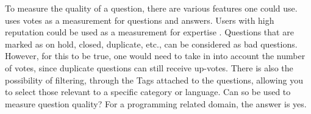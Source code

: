 To measure the quality of a question, there are various features one could use. 
\textcite{M.Sewak2010} uses votes as a measurement for questions and answers.
Users with high reputation could be used as a measurement for expertise \cite{Movshovitz-Attias2013}.
Questions that are marked as on hold, closed, duplicate, etc., can be considered as bad questions.
However, for this to be true, one would need to take in into account the number of votes, since duplicate questions can still receive up-votes.
There is also the possibility of filtering, through the Tags attached to the questions, allowing you to select those relevant to a specific category or language.
Can \gls{so} be used to measure question quality?
For a programming related domain, the answer is yes.

\begin{comment}
The same can be said for bad questions. 
In many cases, a question is bad not because of the question that is asked, but simply because it does not follow the guidelines. 
If a question is a duplicate, it is automatically voted for closure, and will in most cases receive multiple down-votes. 
Questions which gives a hint of being school related will also receive down-votes, mainly because \gls{so} targets professionals and experts. 
\gls{so} is neither a fan of unnecessary text like greetings and gratefulness \cite{CommunityWiki2016a,Heyer2012}.
Is \gls{so} fit for measuring question quality?
In a closed domain setting, the answer is yes. 
However, as mentioned, what type of quality being measured must be taken into consideration. 
As it is, the system would not be useful for an educational setting, because it bases its prediction on questions asked on \gls{so}.
If a student were to ask the system a question, it might respond saying that this is a bad question (but the result may be based on the fact that it is a duplicate).
For an educational setting, a better solution would be to develop a system similar to the one in \cite{Lezina2013}.
With the current state of the system (if it were to be used), it would be more appropriate to use it as a measurement tool for new \gls{so} questions, rather then general question quality.
\end{comment}

